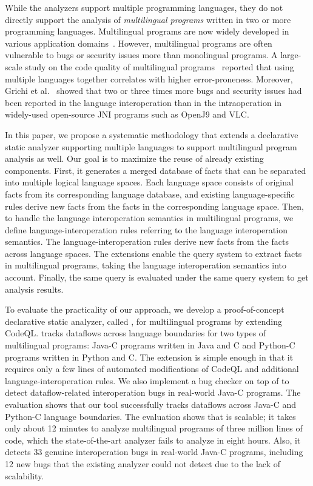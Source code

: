 While the analyzers support multiple programming languages, they do not
directly support the analysis of \textit{multilingual programs} written in two
or more programming languages.  Multilingual programs are now widely developed
in various application domains~\cite{kochhar2016large, mergendahlcross}.
However, multilingual programs are often vulnerable to bugs or security issues
more than monolingual programs. A large-scale study on the code quality of
multilingual programs~\cite{kochhar2016large} reported that using multiple
languages together correlates with higher error-proneness. Moreover, Grichi et
al.~\cite{grichi2020impact} showed that two or three times more bugs and
security issues had been reported in the language interoperation than in the
intraoperation in widely-used open-source JNI programs such as OpenJ9 and VLC.

In this paper, we propose a systematic methodology that extends a declarative
static analyzer supporting multiple languages to support multilingual program
analysis as well. Our goal is to maximize the reuse of already existing
components. First, it generates a merged database of facts that can be
separated into multiple logical language spaces.  Each language space consists
of original facts from its corresponding language database, and existing
language-specific rules derive new facts from the facts in the corresponding
language space. Then, to handle the language interoperation semantics in
multilingual programs, we define language-interoperation rules referring to the
language interoperation semantics. The language-interoperation rules derive new
facts from the facts across language spaces. The extensions enable the query
system to extract facts in multilingual programs, taking the language
interoperation semantics into account.  Finally, the same query is evaluated
under the same query system to get analysis results.

To evaluate the practicality of our approach, we develop a proof-of-concept
declarative static analyzer, called \ours, for multilingual programs by
extending CodeQL. \ours tracks dataflows across language boundaries for two
types of multilingual programs: Java-C programs written in Java and C and
Python-C programs written in Python and C. The extension is simple enough in
that it requires only a few lines of automated modifications of CodeQL and
additional language-interoperation rules. We also implement a bug checker on
top of \ours to detect dataflow-related interoperation bugs in real-world
Java-C programs.  The evaluation shows that our tool successfully tracks
dataflows across Java-C and Python-C language boundaries.  The evaluation shows
that \ours is scalable; it takes only about 12 minutes to analyze multilingual
programs of three million lines of code, which the state-of-the-art analyzer
fails to analyze in eight hours.  Also, it detects 33 genuine interoperation
bugs in real-world Java-C programs, including 12 new bugs that the existing
analyzer could not detect due to the lack of scalability.

